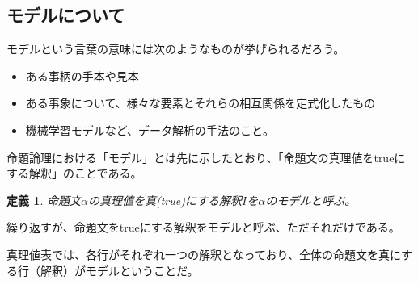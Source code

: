 \documentclass[dvipdfmx]{jsarticle}
\newtheorem{dfn}{定義}
\begin{document}
\subsection{モデルについて}
モデルという言葉の意味には次のようなものが挙げられるだろう。
\begin{itemize}
  \item ある事柄の手本や見本
  \item ある事象について、様々な要素とそれらの相互関係を定式化したもの
  \item 機械学習モデルなど、データ解析の手法のこと。
\end{itemize}
命題論理における「モデル」とは先に示したとおり、「命題文の真理値をtrueにする解釈」のことである。
\begin{dfn}
  命題文$\alpha$の真理値を真(true)にする解釈$I$を$\alpha$のモデルと呼ぶ。
\end{dfn}
繰り返すが、命題文をtrueにする解釈をモデルと呼ぶ、ただそれだけである。\par
真理値表では、各行がそれぞれ一つの解釈となっており、全体の命題文を真にする行（解釈）がモデルということだ。
\end{document}
